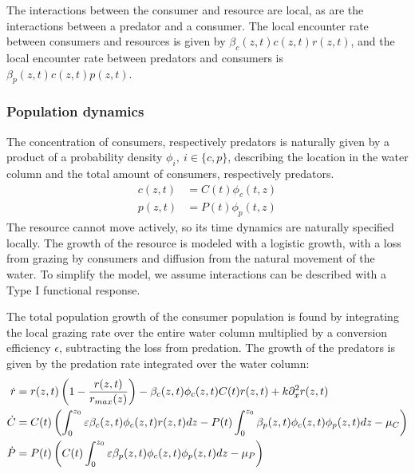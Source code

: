 The interactions between the consumer and resource are local, as are the interactions between a predator and a consumer. The local encounter rate between consumers and resources is given by $\beta_c(z,t)c(z,t)r(z,t)$, and the local encounter rate between predators and consumers is $\beta_p(z,t)c(z,t)p(z,t)$.

\subsubsection*{Population dynamics}

The concentration of consumers, respectively predators is naturally given by a product of a probability density  $\phi_i,~i\in \{c,p\}$, describing the location in the water column and the total amount of consumers, respectively predators.
\begin{align}
	c(z,t) &= C(t)\phi_c(t, z) \\
	p(z,t) &= P(t)\phi_p(t, z)
  \label{eq:prob_dens}

\end{align}
The resource cannot move actively, so its time dynamics are naturally specified locally. The growth of the resource is modeled with a logistic growth, with a loss from grazing by consumers and diffusion from the natural movement of the water. To simplify the model, we assume interactions can be described with a Type I functional response. %


The total population growth of the consumer population is found by integrating the local grazing rate over the entire water column multiplied by a conversion efficiency $\epsilon$, subtracting the loss from predation. The growth of the predators is given by the predation rate integrated over the water column:
\begin{align}
	\dot{r} &= r(z,t)\pa{1-\frac{r(z,t)}{r_{max}(z)}} - \beta_c(z,t)\phi_c(z,t)C(t) r(z,t)  + k \partial_x^2 r(z,t)\\
	\dot{C} &= C(t)\left ( \int_0^{z_0} \varepsilon \beta_c(z,t)\phi_c(z,t)r(z,t) dz- P(t)\int_0^{z_0} \beta_p(z,t) \phi_c(z,t) \phi_p(z,t) dz - \mu_C \right ) \\
	\dot{P} &= P(t) \left ( C(t )\int_0^{z_0} \varepsilon \beta_p(z,t) \phi_c(z,t)\phi_p(z,t) dz - \mu_P \right )
  \label{eq:population_growth_prob_dens}

\end{align}


